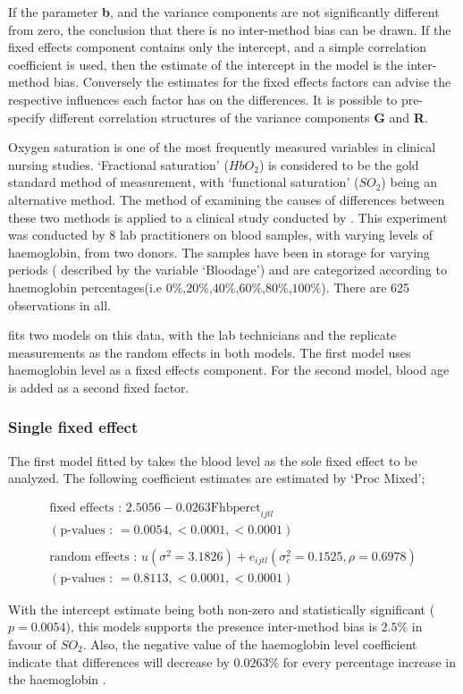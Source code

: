 \documentclass[12pt, a4paper]{report}
\theoremstyle{plain}
\theoremstyle{definition}
\theoremstyle{remark}
\begin{document}
If the parameter \textbf{b}, and the variance components are not
significantly different from zero, the conclusion that there is no
inter-method bias can be drawn. If the fixed effects component
contains only the intercept, and a simple correlation coefficient
is used, then the estimate of the intercept in the model is the
inter-method bias. Conversely the estimates for the fixed effects
factors can advise the respective influences each factor has on
the differences. It is possible to pre-specify different
correlation structures of the variance components \textbf{G} and
\textbf{R}.


Oxygen saturation is one of the most frequently measured variables
in clinical nursing studies. `Fractional saturation' ($HbO_{2}$)
is considered to be the gold standard method of measurement, with
`functional saturation' ($SO_{2}$) being an alternative method.
The method of examining the causes of differences between these
two methods is applied to a clinical study conducted by
\citet{Shiao}. This experiment was conducted by 8 lab
practitioners on blood samples, with varying levels of
haemoglobin, from two donors. The samples have been in storage for
varying periods ( described by the variable `Bloodage') and are
categorized according to haemoglobin percentages(i.e
$0\%$,$20\%$,$40\%$,$60\%$,$80\%$,$100\%$). There are 625
observations in all.

\citet{LaiShiao} fits two models on this data, with the lab
technicians and the replicate measurements as the random effects
in both models. The first model uses haemoglobin level as a fixed
effects component. For the second model, blood age is added as a
second fixed factor.

\subsubsection{Single fixed effect} The first model fitted by \citet{LaiShiao} takes the
blood level as the sole fixed effect to be analyzed. The following
coefficient estimates are estimated by `Proc Mixed';
\begin{framed}\begin{eqnarray}
\mbox{fixed effects :   } 2.5056 - 0.0263\mbox{Fhbperct}_{ijtl} \\
(\mbox{p-values :   } = 0.0054, <0.0001, <0.0001)\nonumber\\\nonumber\\
\mbox{random effects :   } u(\sigma^{2}=3.1826) + e_{ijtl}
(\sigma^{2}_{e}=0.1525, \rho= 0.6978) \nonumber\\
(\mbox{p-values :   } = 0.8113, <0.0001, <0.0001)\nonumber
\end{eqnarray}
\end{framed}
With the intercept estimate being both non-zero and statistically
significant ($p=0.0054$), this models supports the presence
inter-method bias is $2.5\%$ in favour of $SO_{2}$. Also, the
negative value of the haemoglobin level coefficient indicate that
differences will decrease by $0.0263\%$ for every percentage
increase in the haemoglobin .
\end{document}
